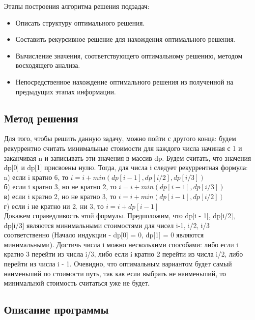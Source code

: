 \documentclass[12pt]{article}
\begin{document}
\noindent Этапы построения алгоритма решения подзадач:
\begin{itemize}
\item  Описать структуру оптимального решения.
\item Составить рекурсивное решение для нахождения оптимального решения.
\item 	Вычисление значения, соответствующего оптимальному решению, методом восходящего анализа.
\item 	Непосредственное нахождение оптимального решения из полученной на предыдущих этапах информации.
	
\end{itemize}

\subsection*{Метод решения}

Для того, чтобы решить данную задачу, можно пойти с другого конца: будем рекуррентно считать минимальные стоимости для каждого числа начиная с 1 и заканчивая n и записывать эти значения в массив dp. Будем считать, что значения dp[0] и dp[1] присвоены нулю. Тогда, для числа i следует рекуррентная формула:\\

a) если i кратно 6, то $i = i + min( dp[ i - 1 ], dp[ i / 2], dp[ i / 3 ] )$ \\

б) если i кратно 3, но не кратно 2, то $i = i + min( dp[ i - 1 ], dp[ i / 3 ] )$\\

в) если i кратно 2, но не кратно 3, то $i = i + min( dp[ i - 1 ], dp[ i / 2 ] )$\\

г) если i не кратно ни 2, ни 3, то $i = i + dp[ i - 1 ]$\\

Докажем справедливость этой формулы. Предположим, что dp[i - 1], dp[i/2], dp[i/3] являются минимальными стоимостями для чисел i-1, i/2, i/3 соответственно (Начало индукции - dp[0] = 0, dp[1] = 0 являются минимальными). Достичь числа i можно несколькими способами: либо если i кратно 3 перейти из числа i/3, либо если i кратно 2 перейти из числа i/2, либо перейти из числа i - 1.  Очевидно, что оптимальным вариантом будет самый наименьший по стоимости путь, так как если выбрать не наименьший, то минимальной стоимость считаться уже не будет. 

\subsection*{Описание программы}
\end{document}
